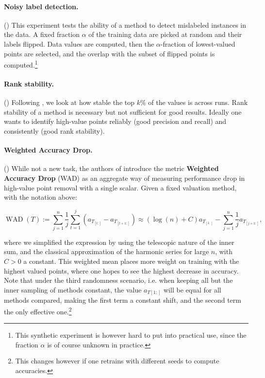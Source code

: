 \documentclass[10pt]{article}
\newcommand{\assign}{:=}
\newcommand{\tmdfn}[1]{\textbf{#1}}
\newcommand{\tmname}[1]{\textsc{#1}}
\newcommand{\tmop}[1]{\ensuremath{\operatorname{#1}}}
\begin{document}
\paragraph{Noisy label detection.}() This experiment
tests the ability of a method to detect mislabeled instances in the data. A
fixed fraction $\alpha$ of the training data are picked at random and their
labels flipped. Data values are computed, then the $\alpha$-fraction of
lowest-valued points are selected, and the overlap with the subset of flipped
points is computed.\footnote{This synthetic experiment is however hard to put
into practical use, since the fraction $\alpha$ is of course unknown in
practice.}

\paragraph{Rank stability.}() Following
{\cite{wang_data_2022}}, we look at how stable the top $k$\% of the values is
across runs. Rank stability of a method is necessary but not sufficient for
good results. Ideally one wants to identify high-value points reliably (good
precision and recall) and consistently (good rank stability).

\paragraph{Weighted Accuracy Drop.}() While not a new task, the
authors of {\cite{schoch_csshapley_2022}} introduce the metric
{\tmdfn{Weighted Accuracy Drop}} ({\tmname{WAD}}) as an aggregate way of
measuring performance drop in high-value point removal with a single scalar.
Given a fixed valuation method, with the notation above:

\begin{equation}
  \label{eq:wad} \tmop{WAD} (T) \assign \sum_{j = 1}^n \frac{1}{j}  \sum_{t =
  1}^j (a_{T_{[t :]}} - a_{T_{[t + 1 :]}}) \approx (\log (n) + C) a_{T_{[1
  :]}} - \sum_{j = 1}^n \frac{1}{j} a_{T_{[j + 1 :]}},
\end{equation}

where we simplified the expression by using the telescopic nature of the inner
sum, and the classical approximation of the harmonic series for large $n$,
with $C > 0$ a constant. This weighted mean places more weight on training
with the highest valued points, where one hopes to see the highest decrease in
accuracy. Note that under the third randomness scenario, i.e. when keeping all
but the inner sampling of methods constant, the value $a_{T [1 :]}$ will be
equal for all methods compared, making the first term a constant shift, and
the second term the only effective one.\footnote{This changes however if one
retrains with different seeds to compute accuracies.}
\end{document}
